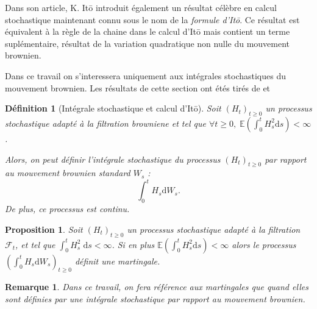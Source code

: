 \documentclass[openany]{book}
\newcommand{\F}{\mathscr{F}}
\newcommand{\E}{\mathbb{E}}
\newcommand{\1}{\mathbbm{1}}
\renewcommand{\d}{\mathrm{d}}
\theoremstyle{thmfont}
\theoremstyle{deffont}
\newtheorem{definition}[definition]{Définition}
\theoremstyle{thmfont}
\newtheorem{prop}[prop]{Proposition}
\theoremstyle{deffont}
\newtheorem{remark}[remark]{Remarque}
\begin{document}
Dans son article, K. Itō introduit également un résultat célèbre en calcul stochastique maintenant connu sous le nom de la \textit{formule d'Itō}. Ce résultat est équivalent à la règle de la chaine dans le calcul d'Itō mais contient un terme suplémentaire, résultat de la variation quadratique non nulle du mouvement brownien.

Dans ce travail on s'interessera uniquement aux intégrales stochastiques du mouvement brownien. Les résultats de cette section ont étés tirés de \cite{russo} et \cite{fournier}%

\begin{definition}[Intégrale stochastique et calcul d'Itō]
  Soit $(H_t)_{t \geq 0}$ un processus stochastique adapté à la filtration browniene et tel que $\forall t \geq 0, \; \E \left(\int_0^t H_s^2 \d s\right) < \infty$.

  Alors, on peut définir \textit{l'intégrale stochastique} du processus $(H_t)_{t\geq0}$ par rapport au mouvement brownien standard $W_s$ :
  $$ \int_0^t H_s \d W_s.$$
  De plus, ce processus est continu.
\end{definition}


\begin{prop} Soit $(H_t)_{t \geq 0}$ un processus stochastique adapté à la filtration  $\F_t$, et tel que $\int_0^t H_s^2\;\d s < \infty$. Si en plus $\E\left(\int_0^tH_s^2 \d s\right) < \infty$ alors le processus $(\int_0^t H_s \d W_s)_{t\geq 0}$ définit une martingale. 
\end{prop}

\begin{remark}
  Dans ce travail, on fera référence aux martingales que quand elles sont définies par une intégrale stochastique par rapport au mouvement brownien.
\end{remark}

\end{document}
